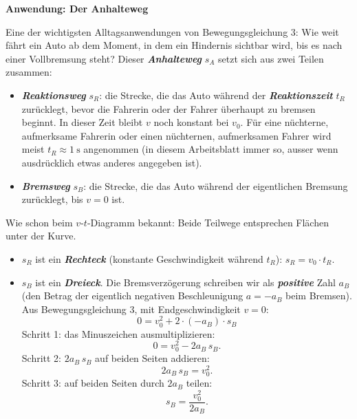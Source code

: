 \documentclass[addpoints,11pt,a4paper]{exam}
\newenvironment{theoriebox}[1][Theorie]{%
  \par\addvspace{10pt}\noindent\textbf{#1}\par\smallskip\noindent
}{%
  \par\addvspace{10pt}
}
\begin{document}
\begin{theoriebox}[Anwendung: Der Anhalteweg]
Eine der wichtigsten Alltagsanwendungen von Bewegungsgleichung 3: Wie
weit fährt ein Auto ab dem Moment, in dem ein Hindernis sichtbar wird,
bis es nach einer Vollbremsung steht? Dieser \textbf{\emph{Anhalteweg}}
$s_A$ setzt sich aus zwei Teilen zusammen:

\begin{itemize}[leftmargin=1.2cm,itemsep=0.25em]
  \item \textbf{\emph{Reaktionsweg}} $s_R$: die Strecke, die das Auto
  während der \textbf{\emph{Reaktionszeit}} $t_R$ zurücklegt, bevor die
  Fahrerin oder der Fahrer überhaupt zu bremsen beginnt. In dieser Zeit
  bleibt $v$ noch konstant bei $v_0$. Für eine nüchterne, aufmerksame
  Fahrerin oder einen nüchternen, aufmerksamen Fahrer wird meist
  $t_R\approx\SI{1}{\second}$ angenommen (in diesem Arbeitsblatt immer
  so, ausser wenn ausdrücklich etwas anderes angegeben ist).
  \item \textbf{\emph{Bremsweg}} $s_B$: die Strecke, die das Auto
  während der eigentlichen Bremsung zurücklegt, bis $v=0$ ist.
\end{itemize}

\begin{center}
\end{center}

Wie schon beim $v$-$t$-Diagramm bekannt: Beide Teilwege entsprechen
Flächen unter der Kurve.
\begin{itemize}[leftmargin=1.2cm,itemsep=0.25em]
  \item $s_R$ ist ein \textbf{\emph{Rechteck}} (konstante Geschwindigkeit
  während $t_R$): $s_R = v_0\cdot t_R$.
  \item $s_B$ ist ein \textbf{\emph{Dreieck}}. Die Bremsverzögerung
  schreiben wir als \textbf{\emph{positive}} Zahl $a_B$ (den Betrag der
  eigentlich negativen Beschleunigung $a=-a_B$ beim Bremsen). Aus
  Bewegungsgleichung 3, mit Endgeschwindigkeit $v=0$:
  \[
    0 = v_0^2 + 2\cdot(-a_B)\cdot s_B
  \]
  Schritt 1: das Minuszeichen ausmultiplizieren:
  \[
    0 = v_0^2 - 2a_B\,s_B.
  \]
  Schritt 2: $2a_B\,s_B$ auf beiden Seiten addieren:
  \[
    2a_B\,s_B = v_0^2.
  \]
  Schritt 3: auf beiden Seiten durch $2a_B$ teilen:
  \[
    s_B = \frac{v_0^2}{2a_B}.
  \]
\end{itemize}


\end{theoriebox}
\end{document}
